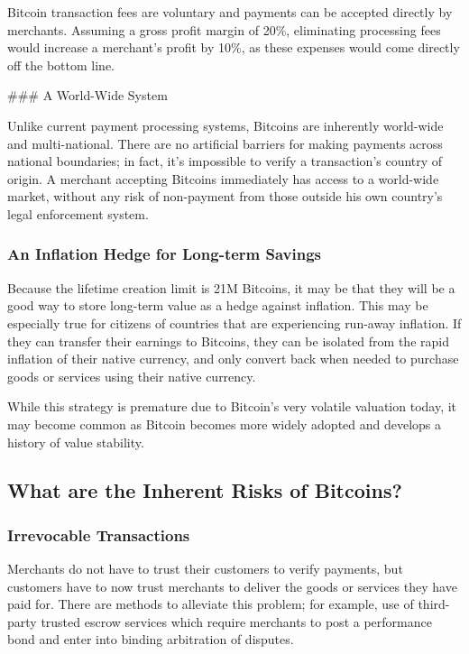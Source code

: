 \documentclass[12pt,twocolumn]{article}
\begin{document}
Bitcoin transaction fees are voluntary and payments can be accepted
directly by merchants. Assuming a gross profit margin of 20\%,
eliminating processing fees would increase a merchant's profit by 10\%,
as these expenses would come directly off the bottom line.

 \#\#\# A World-Wide System

Unlike current payment processing systems, Bitcoins are inherently
world-wide and multi-national. There are no artificial barriers for
making payments across national boundaries; in fact, it's impossible to
verify a transaction's country of origin. A merchant accepting Bitcoins
immediately has access to a world-wide market, without any risk of
non-payment from those outside his own country's legal enforcement
system.

\subsubsection{An Inflation Hedge for Long-term Savings}

Because the lifetime creation limit is 21M Bitcoins, it may be that they
will be a good way to store long-term value as a hedge against
inflation. This may be especially true for citizens of countries that
are experiencing run-away inflation. If they can transfer their earnings
to Bitcoins, they can be isolated from the rapid inflation of their
native currency, and only convert back when needed to purchase goods or
services using their native currency.

While this strategy is premature due to Bitcoin's very volatile
valuation today, it may become common as Bitcoin becomes more widely
adopted and develops a history of value stability.

\subsection{What are the Inherent Risks of Bitcoins?}

\subsubsection{Irrevocable Transactions}

Merchants do not have to trust their customers to verify payments, but
customers have to now trust merchants to deliver the goods or services
they have paid for. There are methods to alleviate this problem; for
example, use of third-party trusted escrow services which require
merchants to post a performance bond and enter into binding arbitration
of disputes.
\end{document}
